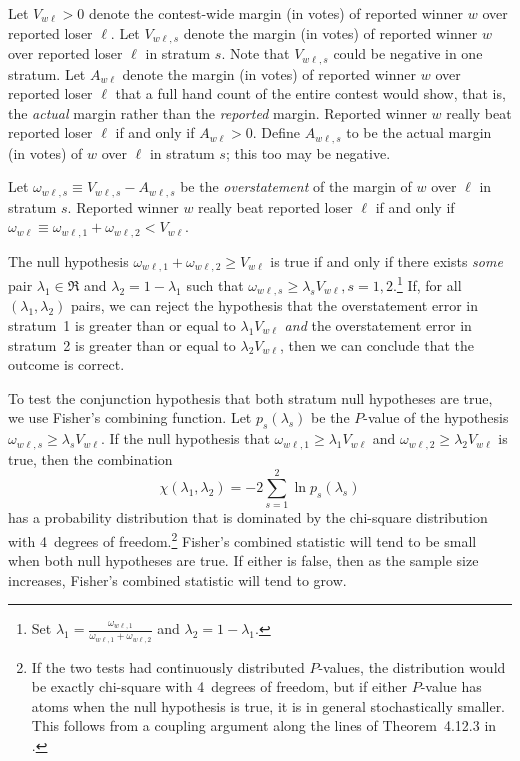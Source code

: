 \documentclass[runningheads]{llncs}
\newcommand{\beq}{\begin{equation}}
\newcommand{\eeq}{\end{equation}}
\begin{document}
Let $V_{w\ell} > 0$ denote the contest-wide margin (in votes) of reported winner 
$w$ over reported loser
$\ell$.
Let $V_{w\ell,s}$ denote the margin (in votes) of reported winner $w$ over reported loser $\ell$
in stratum $s$. 
Note that $V_{w\ell,s}$ could be negative in one stratum.
Let $A_{w\ell}$ denote the margin (in votes)
of reported winner $w$ over reported loser $\ell$ that 
a full hand count of the entire contest would show, that is, the \emph{actual} margin rather
than the \emph{reported} margin.
Reported winner $w$ really beat reported loser $\ell$ if and only if $A_{w\ell} > 0$.
Define $A_{w\ell,s}$ to be the actual margin (in votes) of $w$ over $\ell$ in stratum $s$;
this too may be negative.

Let $\omega_{w\ell,s} \equiv V_{w\ell,s} - A_{w\ell,s}$ be the \emph{overstatement}
of the margin of $w$ over $\ell$ in stratum $s$.
Reported winner $w$ really beat reported loser 
$\ell$ if and only if $\omega_{w\ell} \equiv \omega_{w\ell,1} + \omega_{w\ell,2} < V_{w\ell}$.

The null hypothesis $\omega_{w\ell, 1} + \omega_{w\ell, 2} \ge V_{w\ell}$ is true if and only if there exists \textit{some} pair $\lambda_1 \in \Re$ and $\lambda_2 = 1-\lambda_1$ such that $\omega_{w\ell, s}\ge \lambda_s V_{w\ell}, s=1, 2$.\footnote{
Set $\lambda_1 = \frac{\omega_{w\ell, 1}}{\omega_{w\ell, 1}+\omega_{w\ell, 2}}$ and $\lambda_2 = 1-\lambda_1$.
}
If, for all $(\lambda_1, \lambda_2)$ pairs, we can reject the hypothesis that the 
overstatement error in stratum~1 is greater than or equal to $\lambda_1 V_{w\ell}$ \emph{and} 
the overstatement error in stratum~2 is greater than or equal to $\lambda_2 V_{w\ell}$, then
we can conclude that the outcome is correct.

To test the conjunction hypothesis that both stratum null hypotheses are true, we use 
Fisher's combining function.
Let $p_s(\lambda_s)$ be the $P$-value of the hypothesis $\omega_{w\ell,s} \ge \lambda_s V_{w\ell}$.
If the null hypothesis that $\omega_{w\ell,1} \ge \lambda_1 V_{w\ell}$ and 
$\omega_{w\ell,2} \ge \lambda_2 V_{w\ell}$ is true, then the combination
\beq
   \chi(\lambda_1, \lambda_2) = -2 \sum_{s=1}^2 \ln p_s(\lambda_s)
\eeq
has a probability distribution that is dominated by the chi-square distribution with 4~degrees
of freedom.\footnote{%
   If the two tests had continuously distributed $P$-values, the distribution would be exactly
   chi-square with 4~degrees of freedom, but if either $P$-value has atoms when
   the null hypothesis is true, it is in general stochastically smaller.
   This follows from a coupling argument along the lines of Theorem~4.12.3 in \cite{grimmett01}.
}
Fisher's combined statistic will tend to be small when both null hypotheses are true.
If either is false, then as the sample size increases, Fisher's combined statistic will tend to grow.
\end{document}
